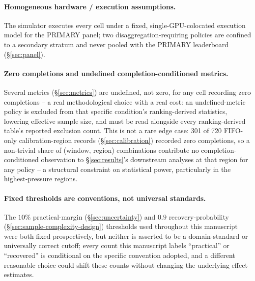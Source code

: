 \paragraph{Homogeneous hardware / execution assumptions.} The simulator
executes every cell under a fixed, single-GPU-colocated execution model for
the PRIMARY panel; two disaggregation-requiring policies are confined to a
secondary stratum and never pooled with the PRIMARY leaderboard
(\S\ref{sec:panel}).

\paragraph{Zero completions and undefined completion-conditioned
metrics.} Several metrics (\S\ref{sec:metrics}) are undefined, not zero,
for any cell recording zero completions -- a real methodological choice
with a real cost: an undefined-metric policy is excluded from that
specific condition's ranking-derived statistics, lowering effective
sample size, and must be read alongside every ranking-derived table's
reported exclusion count. This is not a rare edge case: 301 of 720
FIFO-only calibration-region records (\S\ref{sec:calibration}) recorded
zero completions, so a non-trivial share of (window, region) combinations
contribute no completion-conditioned observation to \S\ref{sec:results}'s
downstream analyses at that region for any policy -- a structural
constraint on statistical power, particularly in the highest-pressure
regions.

\paragraph{Fixed thresholds are conventions, not universal standards.} The
$10\%$ practical-margin (\S\ref{sec:uncertainty}) and $0.9$ recovery-probability
(\S\ref{sec:sample-complexity-design}) thresholds used throughout this
manuscript were both fixed prospectively, but neither is asserted to be a
domain-standard or universally correct cutoff; every count this manuscript
labels ``practical'' or ``recovered'' is conditional on the specific
convention adopted, and a different reasonable choice could shift these
counts without changing the underlying effect estimates.

